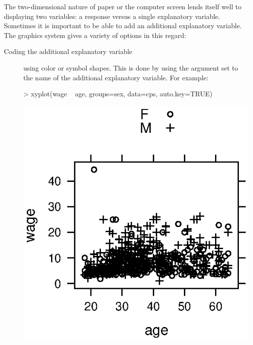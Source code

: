 The two-dimensional nature of paper or the computer screen lends
itself well to displaying two variables: a response versus a single
explanatory variable.  Sometimes it is important to be able to add an
additional explanatory variable.  The graphics system gives a variety
of options in this regard:
\begin{description}
\item[Coding the additional explanatory variable] using color or
  symbol shapes.  This is done by using the  argument set
  to the name of the additional explanatory variable.  For example:
\begin{Schunk}
\begin{Sinput}
> xyplot(wage ~ age, groups=sex, data=cps, 
    auto.key=TRUE)
\end{Sinput}
\end{Schunk}
\includegraphics{Figures/language-scatter4}


\end{description}
